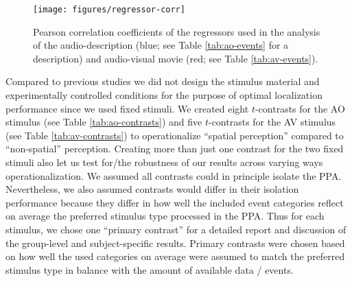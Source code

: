 \documentclass[english]{article}
\begin{document}
\begin{figure}
    \centering
    \texttt{[image: figures/regressor-corr]}
    \caption{Pearson
        correlation coefficients of the regressors used in the analysis of the
        audio-description (blue; see Table \ref{tab:ao-events} for a
        description) and audio-visual movie (red; see Table
        \ref{tab:av-events}).}
    \label{fig:reg-corr}
\end{figure}


Compared to previous studies we did not design the stimulus material and
experimentally controlled conditions for the
purpose of optimal localization performance since we used fixed stimuli.
We created eight $t$-contrasts for the AO stimulus (see Table
\ref{tab:ao-contrasts}) and five $t$-contrasts for the AV stimulus (see Table
\ref{tab:av-contrasts}) to operationalize ``spatial perception'' compared to
``non-spatial'' perception.
Creating more than just one contrast for the two
fixed stimuli also let us test for/the robustness of our results across varying
ways operationalization.
We assumed all contrasts could in principle isolate the PPA. Nevertheless, we
also assumed contrasts would differ in their isolation performance because they
differ in how well the included event categories reflect on average the
preferred stimulus type processed in the PPA.
Thus for each stimulus, we chose one ``primary contrast'' for a detailed report
and discussion of the group-level and subject-specific results. Primary
contrasts were chosen based on how well the used categories on average were
assumed to match the preferred stimulus type in balance with the amount of
available data / events.
\end{document}
